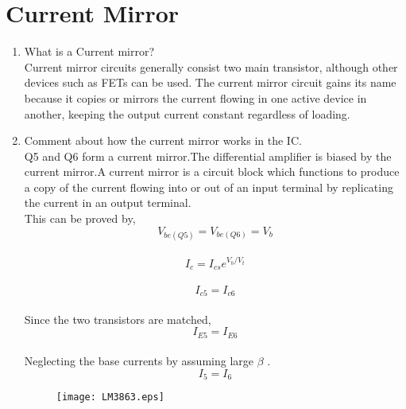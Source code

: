 \documentclass[journal,12pt,twocolumn]{IEEEtran}
\renewcommand\thesection{\arabic{section}}
\begin{document}
\section{Current Mirror}
\begin{enumerate}[label=\thesection.\arabic*,ref=\thesection.\theenumi]
\item What is a Current mirror?\\
\solution Current mirror circuits generally consist two main transistor, although other devices such as FETs can be used. The current mirror circuit gains its name because it copies or mirrors the current flowing in one active device in another, keeping the output current constant regardless of loading.
\item Comment about how the current mirror works in the IC.\\
\solution
Q5 and Q6 form a current mirror.The differential amplifier is biased by the current mirror.A current mirror is a circuit block which functions to produce a copy of the current flowing into or out of an input terminal by replicating the current in an output terminal.\\
This can be proved by,
\bigskip
\vspace{-1em}
$$V_{be(Q5)}=V_{be(Q6)}=V_b$$\\
\vspace{-1em}
$$I_c=I_{cs}e^{V_b/V_t}$$\\
\vspace{-1em}
$$I_{c5}=I_{c6}$$\\
\vspace{-0.5em}
Since the two transistors are matched,\\
\vspace{-1em}
$$I_{E5}=I_{E6}$$\\
\vspace{-0.5em}
Neglecting the base currents by assuming large $\beta$ .\\
\vspace{-1em}
$$I_5=I_6$$


 \begin{figure}[!ht]
\centering
\texttt{[image: LM3863.eps]}
\caption{}
\label{fig:1}
\end{figure}

\end{enumerate}
\end{document}
